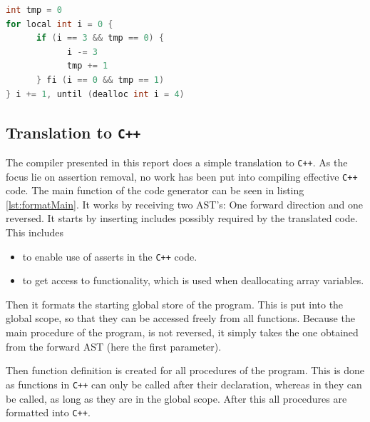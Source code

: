 \begin{lstlisting}[language=C++, label=require-generalize, caption=Loop requirering generalization]
int tmp = 0
for local int i = 0 {
      if (i == 3 && tmp == 0) {
            i -= 3
            tmp += 1
      } fi (i == 0 && tmp == 1)
} i += 1, until (dealloc int i = 4)
\end{lstlisting}

\subsection{Translation to \texttt{C++} \rr}
The \lan compiler presented in this report does a simple translation to \texttt{C++}.
As the focus lie on assertion removal, no work has been put into compiling effective
\texttt{C++} code. The main function of the code generator can be seen in listing
\ref{lst:formatMain}. It works by receiving two AST's: One forward direction and one reversed.
It starts by inserting includes possibly required by the translated code. This includes

\begin{itemize}
      \item {} to enable use of asserts in the \texttt{C++} code.

      \item {} to get access to  functionality, which is used
            when deallocating array variables.
\end{itemize}
\noindent
Then it formats the starting global store of the \lan program. This is put into the global
scope, so that they can be accessed freely from all functions. Because the main procedure of
the \lan program, is not reversed, it simply takes the one obtained from the forward AST
(here the first parameter).

Then function definition is created for all procedures of the program. This is done as
functions in \texttt{C++} can only be called after their declaration, whereas in \lan
they can be called, as long as they are in the global scope.
After this all procedures are formatted into \texttt{C++}.

